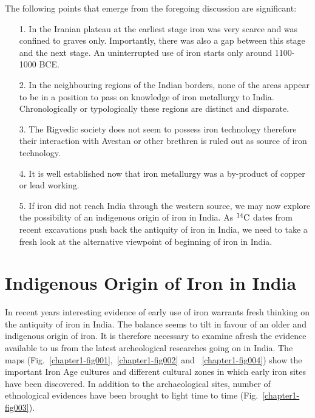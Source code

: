 The following points that emerge from the foregoing discussion are significant:
\begin{itemize}
\item[1.]In the Iranian plateau at the earliest stage iron was very scarce and was confined to graves only. Importantly, there was also a gap between this stage and the next stage. An uninterrupted use of iron starts only around 1100-1000 BCE.

\item[2.] In the neighbouring regions of the Indian borders, none of the areas appear to be in a position to pass on knowledge of iron metallurgy to India. Chronologically or typologically these regions are distinct and disparate.

\item[3.] The Rigvedic society does not seem to possess iron technology therefore their interaction with Avestan or other brethren is ruled out as source of iron technology.

\item[4.] It is well established now that iron metallurgy was a by-product of copper or lead working. 

\item[5.] If iron did not reach India through the western source, we may now explore the possibility of an indigenous origin of iron in India. As $^{14}{\rm C}$ dates from recent excavations push back the antiquity of iron in India, we need to take a fresh look at the alternative viewpoint of beginning of iron in India.
\end{itemize}

\vspace{-.5cm}

\section*{Indigenous Origin of Iron in India}\label{chapter3-section-2}

\vspace{-.2cm}

In recent years interesting evidence of early use of iron warrants fresh thinking on the antiquity of iron in India. The balance seems to tilt in favour of an older and indigenous origin of iron. It is therefore necessary to examine afresh the evidence available to us from the latest archeological researches going on in India. The maps (Fig.~\ref{chapter1-fig001},~\ref{chapter1-fig002} and ~\ref{chapter1-fig004}) show the important Iron Age cultures and different cultural zones in which early iron sites have been discovered. In addition to the archaeological sites, number of ethnological evidences have been brought to light time to time (Fig.~\ref{chapter1-fig003}). 

